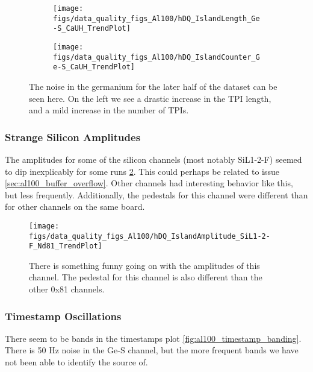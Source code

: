 \documentclass[a4paper]{article}
\begin{document}
\begin{figure}
  \begin{subfigure}{0.5\textwidth}
    \texttt{[image: figs/data\_quality\_figs\_Al100/hDQ\_IslandLength\_Ge-S\_CaUH\_TrendPlot]}
  \end{subfigure}%
  \begin{subfigure}{0.5\textwidth}
    \texttt{[image: figs/data\_quality\_figs\_Al100/hDQ\_IslandCounter\_Ge-S\_CaUH\_TrendPlot]}
  \end{subfigure}
  \caption{The noise in the germanium for the later half
    of the dataset can be seen here. On the left we see a drastic
    increase in the TPI length, and a mild increase in the number
    of TPIs.}
  \label{fig:al100_ge_noise}
\end{figure}


\subsubsection{Strange Silicon Amplitudes}
\label{sec:al100_silicon_amps}

The amplitudes for some of the silicon channels (most notably SiL1-2-F) seemed to dip inexplicably
for some runs \ref{fig:al100_sil12f_amps}.
This could perhaps be related to issue \ref{sec:al100_buffer_overflow}. Other channels
had interesting behavior like this, but less frequently. Additionally, the pedestals
for this channel were different than for other channels on the same board.

\begin{figure}
  \texttt{[image: figs/data\_quality\_figs\_Al100/hDQ\_IslandAmplitude\_SiL1-2-F\_Nd81\_TrendPlot]}
  \caption{There is something funny going on with the amplitudes of this channel.
    The pedestal for this channel is also different than the other 0x81 channels.}
  \label{fig:al100_sil12f_amps}
\end{figure}


\subsubsection{Timestamp Oscillations}
\label{sec:al100_timestamp_oscillations}

There seem to be bands in the timestamps plot \ref{fig:al100_timestamp_banding}.
There is 50 Hz noise in the Ge-S channel, but the more frequent bands
we have not been able to identify the source of.
\end{document}
